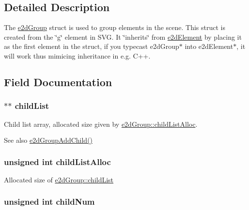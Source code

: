 \subsection{Detailed Description}
The \hyperlink{structe2dGroup}{e2d\-Group} struct is used to group elements in the scene. This struct is created from the \char`\"{}g\char`\"{} element in S\-V\-G. It \char`\"{}inherits\char`\"{} from \hyperlink{structe2dElement}{e2d\-Element} by placing it as the first element in the struct, if you typecast e2d\-Group$\ast$ into e2d\-Element$\ast$, it will work thus mimicing inheritance in e.\-g. C++. 

\subsection{Field Documentation}
\hypertarget{structe2dGroup_a55f6dde874716dc99dcd270fc0999a01}{
\subsubsection[{child\-List}]{$\ast$$\ast$ {\bf child\-List}}}\label{structe2dGroup_a55f6dde874716dc99dcd270fc0999a01}
Child list array, allocated size given by \hyperlink{structe2dGroup_a9c89d7cf35b835ef1917855c78a79cc5}{e2d\-Group\-::child\-List\-Alloc}. \begin{DoxySeeAlso}{See also}
\hyperlink{group__e2dGroup_ga364ad3636ddb85fafbd8817b4d6e2c1d}{e2d\-Group\-Add\-Child()} 
\end{DoxySeeAlso}
\hypertarget{structe2dGroup_a9c89d7cf35b835ef1917855c78a79cc5}{
\subsubsection[{child\-List\-Alloc}]{\setlength{\rightskip}{0pt plus 5cm}unsigned int {\bf child\-List\-Alloc}}}\label{structe2dGroup_a9c89d7cf35b835ef1917855c78a79cc5}
Allocated size of \hyperlink{structe2dGroup_a55f6dde874716dc99dcd270fc0999a01}{e2d\-Group\-::child\-List} \hypertarget{structe2dGroup_a0af3697c2c9df6ed0ddd340cded35d65}{
\subsubsection[{child\-Num}]{\setlength{\rightskip}{0pt plus 5cm}unsigned int {\bf child\-Num}}}\label{structe2dGroup_a0af3697c2c9df6ed0ddd340cded35d65}
